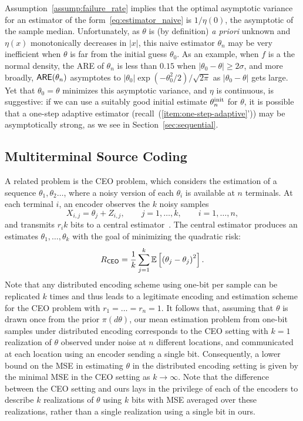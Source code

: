 Assumption~\ref{assump:failure_rate} implies that the optimal asymptotic
variance for an estimator of the form~\eqref{eq:estimator_naive} is $1 /
\eta(0)$, the asymptotic of the sample median. Unfortunately, as $\theta$ is
(by definition) \emph{a priori} unknown and $\eta(x)$ monotonically
decreases in $|x|$, this naive estimator $\theta_n$ may be very inefficient
when $\theta$ is far from the initial guess $\theta_0$. As an example, when
$f$ is a the normal density, the ARE of ${\theta}_n$ is less than $0.15$
when $|\theta_0 - \theta| \ge 2\sigma$, and more broadly, $\mathsf{ARE}(\theta_n)$
asymptotes to $|\theta_0| \exp(-\theta_0^2 / 2) / \sqrt{2\pi}$ as $|\theta_0
- \theta|$ gets large.  Yet that $\theta_0 = \theta$ minimizes this
asymptotic variance, and $\eta$ is continuous, is suggestive: if we can use
a suitably good initial estimate $\theta_n^{\textup{init}}$ for $\theta$, it is
possible that a one-step adaptive estimator
(recall~(\ref{item:one-step-adaptive}')) may be asymptotically strong, as we
see in Section~\ref{sec:sequential}.

\subsection{Multiterminal Source Coding}
\label{sec:ceo}

A related problem is the CEO problem, which considers the estimation of a
sequence $\theta_1,\theta_2\ldots$, where a noisy version of each $\theta_i$
is available at $n$ terminals. At each terminal $i$, an encoder observes the
$k$ noisy samples
\[
X_{i,j} = \theta_j + Z_{i,j},\qquad j=1,\ldots,k, \qquad i = 1,\ldots,n,
\]
and transmits $r_i k$ bits to a central estimator~\cite{berger1996ceo}. The
central estimator produces an estimates ${\theta}_1,\ldots,{\theta}_k$ with
the goal of minimizing the quadratic risk:
\[
R_{\mathsf{CEO}} = \frac{1}{k} \sum_{j=1}^k \mathbb E \left[\left(\theta_j - {\theta}_j \right)^2 \right]. 
\]
Note that any distributed encoding scheme using one-bit per sample can be replicated $k$ times and thus leads to a legitimate encoding and estimation scheme for the CEO problem with $r_1=\ldots=r_n = 1$. It follows that, assuming that $\theta$ is drawn once from the prior $\pi(d\theta)$, our mean estimation problem from one-bit samples under distributed encoding corresponds to the CEO setting with $k=1$ realization of $\theta$ observed under noise at $n$ different locations, and communicated at each location using an encoder sending a single bit. 
%
Consequently, a lower bound on the MSE in estimating $\theta$ in the
distributed encoding setting is given by the minimal MSE in the CEO setting
as $k \to \infty$. Note that the difference between the CEO setting and ours
lays in the privilege of each of the encoders to describe $k$ realizations
of $\theta$ using $k$ bits with MSE averaged over these realizations, rather
than a single realization using a single bit in ours.

